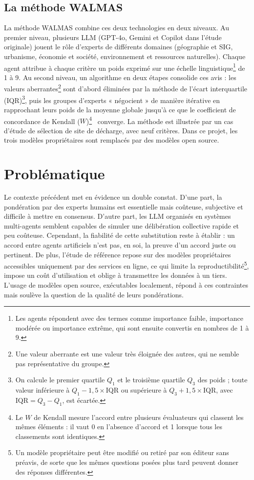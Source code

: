 \documentclass[11pt,a4paper]{article}
\begin{document}
\subsection{La méthode WALMAS}

La méthode WALMAS combine ces deux technologies en deux niveaux. Au premier niveau, plusieurs LLM (GPT-4o, Gemini et Copilot dans l'étude originale) jouent le rôle d'experts de différents domaines (géographie et SIG, urbanisme, économie et société, environnement et ressources naturelles). Chaque agent attribue à chaque critère un poids exprimé sur une échelle linguistique\footnote{Les agents répondent avec des termes comme importance faible, importance modérée ou importance extrême, qui sont ensuite convertis en nombres de 1 à 9.} de 1 à 9. Au second niveau, un algorithme en deux étapes consolide ces avis : les valeurs aberrantes\footnote{Une valeur aberrante est une valeur très éloignée des autres, qui ne semble pas représentative du groupe.} sont d'abord éliminées par la méthode de l'écart interquartile (IQR)\footnote{On calcule le premier quartile $Q_1$ et le troisième quartile $Q_3$ des poids ; toute valeur inférieure à $Q_1-1{,}5\times\mathrm{IQR}$ ou supérieure à $Q_3+1{,}5\times\mathrm{IQR}$, avec $\mathrm{IQR}=Q_3-Q_1$, est écartée.}, puis les groupes d'experts « négocient » de manière itérative en rapprochant leurs poids de la moyenne globale jusqu'à ce que le coefficient de concordance de Kendall ($W$)\footnote{Le $W$ de Kendall mesure l'accord entre plusieurs évaluateurs qui classent les mêmes éléments : il vaut 0 en l'absence d'accord et 1 lorsque tous les classements sont identiques.}~\cite{kendall} converge. La méthode est illustrée par un cas d'étude de sélection de site de décharge, avec neuf critères. Dans ce projet, les trois modèles propriétaires sont remplacés par des modèles open source.

\section{Problématique}

Le contexte précédent met en évidence un double constat. D'une part, la pondération par des experts humains est essentielle mais coûteuse, subjective et difficile à mettre en consensus. D'autre part, les LLM organisés en systèmes multi-agents semblent capables de simuler une délibération collective rapide et peu coûteuse. Cependant, la fiabilité de cette substitution reste à établir : un accord entre agents artificiels n'est pas, en soi, la preuve d'un accord juste ou pertinent. De plus, l'étude de référence repose sur des modèles propriétaires accessibles uniquement par des services en ligne, ce qui limite la reproductibilité\footnote{Un modèle propriétaire peut être modifié ou retiré par son éditeur sans préavis, de sorte que les mêmes questions posées plus tard peuvent donner des réponses différentes.}, impose un coût d'utilisation et oblige à transmettre les données à un tiers. L'usage de modèles open source, exécutables localement, répond à ces contraintes mais soulève la question de la qualité de leurs pondérations.
\end{document}
